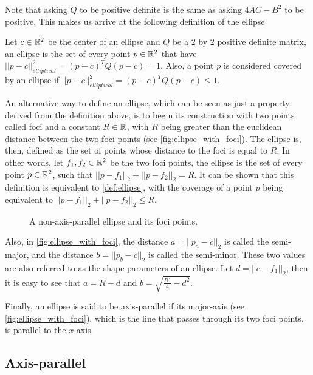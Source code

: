 Note that asking $Q$ to be positive definite is the same as asking $4AC-B^2$ to be positive. This makes us arrive at the following definition of the ellipse

\begin{definicao}\label{def:ellipse}
    Let $c\in \mathbb{R}^2$ be the center of an ellipse and $Q$ be a $2$ by $2$ positive definite matrix, an ellipse is the set of every point $p \in \mathbb{R}^2$ that have $||p-c||_{elliptical}^2 = (p-c)^{T}Q(p-c) = 1$. Also, a point $p$ is considered covered by an ellipse if $||p-c||_{elliptical}^2 = (p-c)^{T}Q(p-c) \le 1$.
\end{definicao}

An alternative way to define an ellipse, which can be seen as just a property derived from the definition above, is to begin its construction with two points called foci and a constant $R \in \mathbb{R}$, with $R$ being greater than the euclidean distance between the two foci points (see \autoref{fig:ellipse_with_foci}). The ellipse is, then, defined as the set of points whose distance to the foci is equal to $R$. In other words, let $f_1, f_2 \in \mathbb{R}^2$ be the two foci points, the ellipse is the set of every point $p \in \mathbb{R}^2$, such that $||p-f_1||_2 + ||p-f_2||_2 = R$. It can be shown that this definition is equivalent to \autoref{def:ellipse}, with the coverage of a point $p$ being equivalent to $||p-f_1||_2 + ||p-f_2||_2 \le R$.

\begin{figure}[H]
    \centering
    
    \caption{A non-axis-parallel ellipse and its foci points.}
    
    \fautor
    \label{fig:ellipse_with_foci}
\end{figure}

Also, in \autoref{fig:ellipse_with_foci}, the distance $a = ||p_a - c||_2$ is called the semi-major, and the distance $b = ||p_b-c||_2$ is called the semi-minor. These two values are also referred to as the shape parameters of an ellipse. Let $d = ||c-f_1||_2$, then it is easy to see that $a = R - d$ and $b = \sqrt{\frac{R^2}{4} - d^2}$.

Finally, an ellipse is said to be axis-parallel if its major-axis (see \autoref{fig:ellipse_with_foci}), which is the line that passes through its two foci points, is parallel to the $x$-axis.

\subsection{Axis-parallel}

